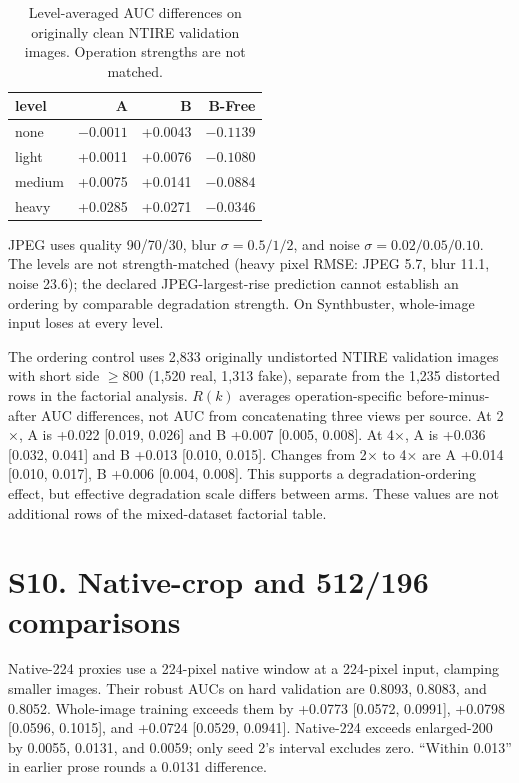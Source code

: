 \documentclass[letterpaper]{article}
\begin{document}
\begin{table}[t]
\centering\small
\begin{tabular}{lrrr}
\toprule
level & A & B & B-Free \\
\midrule
none & $-0.0011$ & +0.0043 & $-0.1139$ \\
light & +0.0011 & +0.0076 & $-0.1080$ \\
medium & +0.0075 & +0.0141 & $-0.0884$ \\
heavy & +0.0285 & +0.0271 & $-0.0346$ \\
\bottomrule
\end{tabular}
\caption{Level-averaged AUC differences on originally clean NTIRE validation images. Operation strengths are not matched.}
\label{tab:grid}
\end{table}

JPEG uses quality 90/70/30, blur $\sigma=0.5/1/2$, and noise $\sigma=0.02/0.05/0.10$. The levels are not strength-matched (heavy pixel RMSE: JPEG 5.7, blur 11.1, noise 23.6); the declared JPEG-largest-rise prediction cannot establish an ordering by comparable degradation strength. On Synthbuster, whole-image input loses at every level.

The ordering control uses 2,833 originally undistorted NTIRE validation images with short side $\geq800$ (1,520 real, 1,313 fake), separate from the 1,235 distorted rows in the factorial analysis. $R(k)$ averages operation-specific before-minus-after AUC differences, not AUC from concatenating three views per source. At 2$\times$, A is +0.022 [0.019, 0.026] and B +0.007 [0.005, 0.008]. At 4$\times$, A is +0.036 [0.032, 0.041] and B +0.013 [0.010, 0.015]. Changes from 2$\times$ to 4$\times$ are A +0.014 [0.010, 0.017], B +0.006 [0.004, 0.008]. This supports a degradation-ordering effect, but effective degradation scale differs between arms. These values are not additional rows of the mixed-dataset factorial table.

\section{S10. Native-crop and 512/196 comparisons}

Native-224 proxies use a 224-pixel native window at a 224-pixel input, clamping smaller images. Their robust AUCs on hard validation are 0.8093, 0.8083, and 0.8052. Whole-image training exceeds them by +0.0773 [0.0572, 0.0991], +0.0798 [0.0596, 0.1015], and +0.0724 [0.0529, 0.0941]. Native-224 exceeds enlarged-200 by 0.0055, 0.0131, and 0.0059; only seed 2's interval excludes zero. ``Within 0.013'' in earlier prose rounds a 0.0131 difference.
\end{document}
